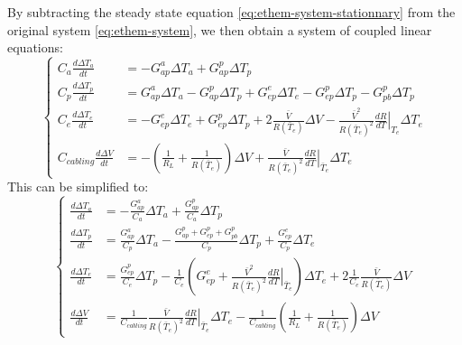  By subtracting the steady state equation \ref{eq:ethem-system-stationnary} from the original system \ref{eq:ethem-system}, we then obtain a system of coupled linear equations:
\begin{equation}
\label{eq:ethem-system-temp}
\begin{cases}
\displaystyle C_a \frac{d \Delta T_a}{d t}
	&= -G_{ap}^a \Delta T_a + G_{ap}^p \Delta T_p 
	 \\[10pt]
\displaystyle C_p \frac{d \Delta T_p}{d t} 
	&= G_{ap}^a \Delta T_a - G_{ap}^p \Delta T_p
	+ G_{ep}^e \Delta T_e - G_{ep}^p \Delta T_p
	- G_{pb}^p \Delta T_p
	 \\[10pt]
\displaystyle C_e \frac{d \Delta T_e}{d t}
	&= - G_{ep}^e \Delta T_e + G_{ep}^p \Delta T_p
	+2\frac{\bar{V}}{R(\bar{T}_e)} \Delta V - \frac{\bar{V}^2}{R(\bar{T}_e)^2} \left.\frac{d R}{d T}\right\vert_{T_e} \Delta T_e
 	 \\[10pt]
\displaystyle C_{cabling} \frac{d \Delta V}{d t} &= - \left( \frac{1}{R_L} + \frac{1}{R(\bar{T}_e)} \right) \Delta V + \frac{\bar{V}}{R(\bar{T}_e)^2} \left.\frac{d R}{d T}\right\vert_{\bar{T}_e} \Delta T_e
\end{cases}
\end{equation}
This can be simplified to:
\begin{equation}
\label{eq:ethem-system-temp-simplified}
\begin{cases}
\displaystyle \frac{d \Delta T_a}{d t}
	&= -\frac{G_{ap}^a}{C_a} \Delta T_a + \frac{G_{ap}^p}{C_a} \Delta T_p 
	 \\[10pt]
\displaystyle \frac{d \Delta T_p}{d t} 
	&= \frac{G_{ap}^a}{C_p} \Delta T_a - \frac{G_{ap}^p+G_{ep}^p+G_{pb}^p}{C_p} \Delta T_p	+ \displaystyle \frac{G_{ep}^e }{C_p}\Delta T_e
	 \\[10pt]
\displaystyle \frac{d \Delta T_e}{d t}
	&= \frac{G_{ep}^p}{C_e} \Delta T_p - \frac{1}{C_e} \left(G_{ep}^e + \frac{\bar{V}^2}{R(\bar{T}_e)^2} \left.\frac{d R}{d T}\right\vert_{\bar{T}_e}\right) \Delta T_e 
	+2 \frac{1}{C_e} \frac{\bar{V}}{R(\bar{T}_e)} \Delta V
 	 \\[10pt]
\displaystyle \frac{d \Delta V}{d t} &= \frac{1}{C_{cabling}} \frac{\bar{V}}{R(\bar{T}_e)^2} \left.\frac{d R}{d T}\right\vert_{\bar{T}_e} \Delta T_e - \frac{1}{C_{cabling}}\left( \frac{1}{R_L} + \frac{1}{R(\bar{T}_e)} \right) \Delta V
\end{cases}
\end{equation}

